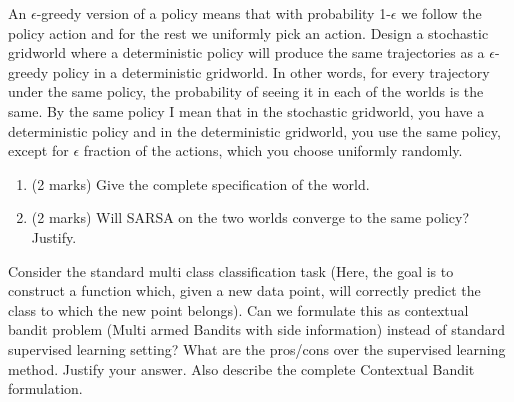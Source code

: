\documentclass[addpoints,12pt,solution]{exam}
\begin{document}
\begin{questions}
\begin{enumerate}[label=(\alph*)]
\begin{solution}
\end{solution}
    
    
\end{enumerate}

 An $\epsilon$-greedy version of a policy means that with probability 1-$\epsilon$ we follow the policy action and for the rest we uniformly pick an action.
Design a stochastic gridworld where a deterministic policy will produce
the same trajectories as a $\epsilon$-greedy policy in a deterministic
gridworld. In other words, for every trajectory under the same policy, the
probability of seeing it in each of the worlds is the same. By the same policy I mean that in the stochastic gridworld, you have a deterministic policy and in the
deterministic gridworld, you use the same policy, except for $\epsilon$ fraction of the actions, which you choose uniformly randomly. 

\begin{enumerate}[label=(\alph*)]

\item (2 marks) Give the complete specification of the world.

\begin{solution}
  
\end{solution}


\item (2 marks) Will SARSA on the two worlds converge to the same policy? Justify.

\begin{solution}

\end{solution}

\end{enumerate}

 Consider the standard multi class classification task (Here, the goal is to construct a function which, given a new data point, will correctly predict the class to which the new point belongs). Can we formulate this as contextual bandit problem (Multi armed Bandits with side information) instead of standard supervised learning setting? What are the pros/cons over the supervised learning method. Justify your answer. Also describe the complete Contextual Bandit formulation.

\begin{solution}

\end{solution}

\end{questions}
\end{document}
